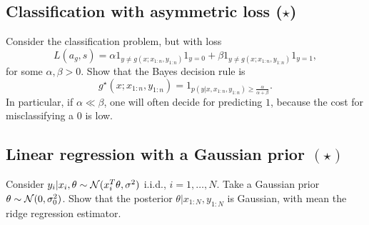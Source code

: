 \documentclass{article}
\newif\ifsolutions
\newcommand\solution[1]{
\ifsolutions
\begin{mdframed}[style=MyFrame]
\textcolor{bleu}{\textbf{Solution:} #1}
\end{mdframed}
\fi
}
\begin{document}
\solution{
The solution is basically \cite[Section 1.2]{Efr10}. The book is also highly recommended, especially if you are into large-scale hypothesis tests. At least, read the prologue for statistical culture.
}

\subsection{Classification with asymmetric loss ($\star$)}
Consider the classification problem, but with loss
$$
L(a_g,s) = \alpha 1_{y\neq g(x; x_{1:n}, y_{1:n})} 1_{y=0} + \beta 1_{y\neq g(x; x_{1:n}, y_{1:n})} 1_{y=1},
$$
for some $\alpha,\beta>0$.
Show that the Bayes decision rule is
$$ g^\star(x; x_{1:n}, y_{1:n}) = 1_{p(y\vert x, x_{1:n}, y_{1:n}) \geq \frac{\alpha}{\alpha+\beta}}.$$
In particular, if $\alpha\ll\beta$, one will often decide for predicting $1$, because the cost for misclassifying a 0 is low.

\solution{
For brevity, we drop the dependence of $g$ in the training set and write $g(x)$ for $g(x; x_{1:n}, y_{1:n})$. Following the posterior expected loss rationale, we pick action
\begin{align*}
  a^\star = a_{g^\star} &\in \argmin \int L(a_g,s) p(s_u\vert s_o) \d s_u\\
  &= \argmin \int \left[\alpha 1_{y\neq g(x)} 1_{y=0} + \beta 1_{y\neq g(x)} 1_{y=1} \right] p(y\vert x_{1:N}, y_{1:N}, x) \d y\\
  &= \argmin \alpha 1_{0\neq g(x)} p(y=0\vert x_{1:N}, y_{1:N}, x) \\
  &\qquad\qquad\qquad\qquad\qquad + \beta 1_{1\neq g(x)} p(y=1\vert x_{1:N}, y_{1:N}, x).
\end{align*}
This is equivalent to setting $g^\star(x) = 1$ if and only if
$$ \alpha p(y=0\vert x_{1:N}, y_{1:N}, x) \leq \beta p(y=1\vert x_{1:N}, y_{1:N}, x).$$
Letting $q=p(y=1\vert x_{1:N}, y_{1:N}, x)$, this becomes
$$ \alpha(1-q)\leq \beta q,$$
or, equivalently,
$$ q\geq \alpha/(\alpha+\beta).$$
}

\subsection{Linear regression with a Gaussian prior $(\star)$}
Consider $y_i\vert x_i,\theta \sim \mathcal{N}(x_i^T\theta,\sigma^2)$ i.i.d., $i=1,\dots, N$. Take a Gaussian prior $\theta\sim\mathcal{N}(0,\sigma_0^2)$. Show that the posterior $\theta\vert x_{1:N},y_{1:N}$ is Gaussian, with mean the ridge regression estimator.
\end{document}
